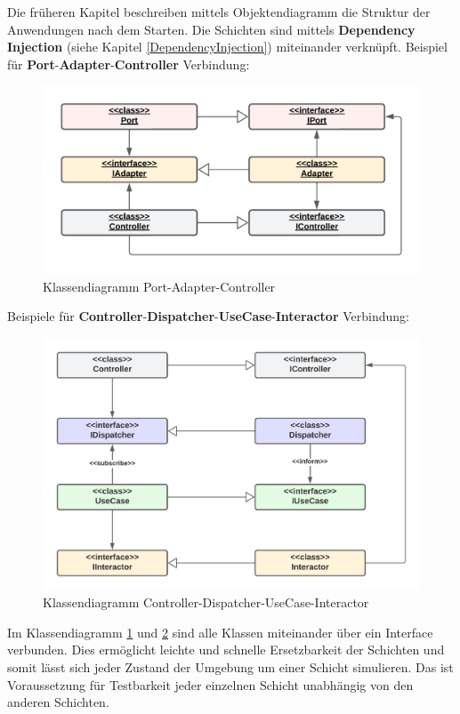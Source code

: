 Die früheren Kapitel beschreiben mittels Objektendiagramm die Struktur der Anwendungen nach dem Starten.
Die Schichten sind mittels \textbf{Dependency Injection} (siehe Kapitel \ref{DependencyInjection})  miteinander verknüpft.
Beispiel für \textbf{Port}-\textbf{Adapter}-\textbf{Controller} Verbindung:

\begin{figure}[H]
    \centering
    \includegraphics[width=12cm]{./images/Klassendiagramm Port-Adapter.png}
    \caption[Klassendiagramm Port-Adapter-Controller]{Klassendiagramm Port-Adapter-Controller}
    \label{fig:FullCDPAC}
\end{figure}

Beispiele für \textbf{Controller}-\textbf{Dispatcher}-\textbf{UseCase}-\textbf{Interactor} Verbindung:
\begin{figure}[H]
    \centering
    \includegraphics[width=12cm]{./images/CDUI-Klassendiagramm.png}
    \caption[Klassendiagramm Controller-Dispatcher-UseCase-Interactor]{Klassendiagramm Controller-Dispatcher-UseCase-Interactor}
    \label{fig:FullCDCDUI}
\end{figure}

Im Klassendiagramm \ref{fig:FullCDPAC} und \ref{fig:FullCDCDUI} sind alle Klassen miteinander über ein Interface verbunden.
Dies ermöglicht leichte und schnelle Ersetzbarkeit der Schichten und 
somit lässt sich jeder Zustand der Umgebung um einer Schicht simulieren. 
Das ist Voraussetzung für Testbarkeit jeder einzelnen Schicht unabhängig von den anderen Schichten.